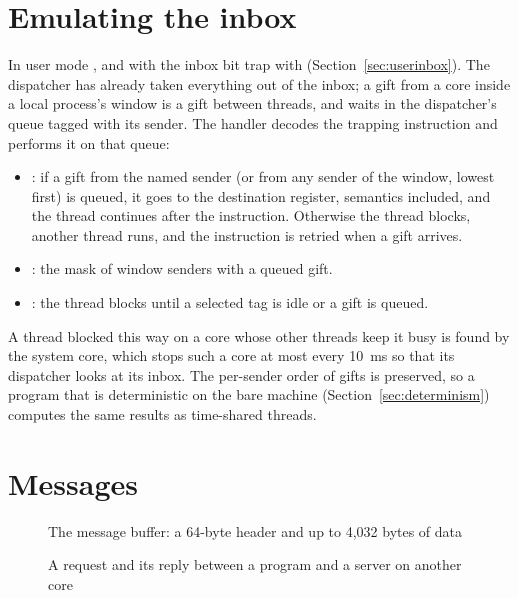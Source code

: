 \section{Emulating the inbox}\label{sec:os-emul}

In user mode ,  and  with the inbox bit trap with 
(Section~\ref{sec:userinbox}). The dispatcher has already taken everything out of the inbox; a gift
from a core inside a local process's window is a gift between threads, and waits in the dispatcher's
queue tagged with its sender. The handler decodes the trapping instruction and performs it on that
queue:
\begin{itemize}
\item {}: if a gift from the named sender (or from any sender of the window, lowest first)
  is queued, it goes to the destination register,  semantics included, and the thread
  continues after the instruction. Otherwise the thread blocks, another thread runs, and the
  instruction is retried when a gift arrives.
\item {}: the mask of window senders with a queued gift.
\item {}: the thread blocks until a selected tag is idle or a gift is queued.
\end{itemize}
A thread blocked this way on a core whose other threads keep it busy is found by the system core,
which stops such a core at most every 10~ms so that its dispatcher looks at its inbox. The per-sender
order of gifts is preserved, so a program that is deterministic on the bare machine
(Section~\ref{sec:determinism}) computes the same results as time-shared threads.

\section{Messages}\label{sec:os-msg}

\begin{figure}[htbp]
\centering

\caption{The message buffer: a 64-byte header and up to 4,032 bytes of data}\label{fig:os-msgbuf}
\end{figure}

\begin{figure}[htbp]
\centering

\caption{A request and its reply between a program and a server on another core}\label{fig:os-roundtrip}
\end{figure}


